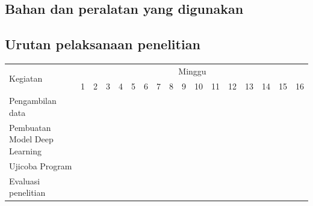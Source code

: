 \subsection{Bahan dan peralatan yang digunakan}

\lipsum[13]

\subsection{Urutan pelaksanaan penelitian}

\newcommand{\w}{}
\newcommand{\G}{\cellcolor{gray}}
\begin{table}[h!]
  \begin{tabular}{|p{3.5cm}|c|c|c|c|c|c|c|c|c|c|c|c|c|c|c|c|}

    \hline
    \multirow{2}{*}{Kegiatan} & \multicolumn{16}{|c|}{Minggu} \\
    \cline{2-17} &
    1 & 2 & 3 & 4 & 5 & 6 & 7 & 8 & 9 & 10 & 11 & 12 & 13 & 14 & 15 & 16 \\
    \hline

    Pengambilan data &
    \G & \G & \G & \G & \w & \w & \w & \w & \w & \w & \w & \w & \w & \w & \w & \w \\
    \hline

    Pembuatan Model Deep Learning &
    \w & \w & \w & \w & \G & \G & \G & \G & \w & \w & \w & \w & \w & \w & \w & \w \\
    \hline

    Ujicoba Program &
    \w & \w & \w & \w & \w & \w & \w & \w & \G & \G & \G & \G & \w & \w & \w & \w \\
    \hline

    Evaluasi penelitian &
    \w & \w & \w & \w & \w & \w & \w & \w & \w & \w & \w & \w & \G & \G & \G & \G \\
    \hline

  \end{tabular}
\end{table}